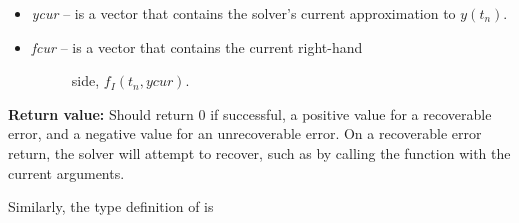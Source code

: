 \documentclass[letterpaper,10pt,english]{sphinxmanual}
\begin{document}
\begin{fulllineitems}
\begin{description}
\begin{itemize}
\item {} 
\emph{ycur} -- is a vector that contains the solver's current
approximation to $y(t_n)$.

\item {} \begin{description}
\item[{\emph{fcur} -- is a vector that contains the current right-hand}] \leavevmode
side, $f_I(t_n, ycur)$.

\end{description}

\end{itemize}

\end{description}

\textbf{Return value:}  Should return 0 if successful, a positive value
for a recoverable error, and a negative value for an unrecoverable
error.  On a recoverable error return, the solver will attempt to
recover, such as by calling the {\hyperref[linear_solvers/custom:lsetup]{}} function with
the current arguments.

\end{fulllineitems}


Similarly, the type definition of {\hyperref[linear_solvers/custom:msolve]{}} is
\end{document}
